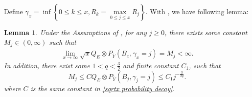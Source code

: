 \documentclass[]{article}
\numberwithin{equation}{section}
\theoremstyle{thmstyleone}%
\theoremstyle{thmstyletwo}%
\theoremstyle{thmstylethree}%
\theoremstyle{thmstylefour}%
\newtheorem{lemma}{Lemma}
\theoremstyle{thmstylefive}%
\theoremstyle{thmstylesix}%
\begin{document}
	Define $ \gamma_x = \inf\left\{0\leqslant k\leqslant x, R_k=\max\limits_{0\leqslant j\leqslant x} R_j\right\}$. 
	With , we have following lemma:
	
	\begin{lemma}\label{intermediately lemma}
		Under the Assumptions of , for any $j\geqslant 0$, there exists some constant $ M_j\in (0,\infty)$ such that
		\begin{align}
			\lim\limits_{x\rightarrow\infty}\sqrt{x}Q_E\otimes P_{\overline{Y}}
			\left( B_x,\gamma_x = j
			\right) = M_j<\infty.
		\end{align}
		In addition, there exist some $1<q<\frac{3}{2}$ and finite constant $C_1$, such that \[M_j\leqslant C Q_E\otimes P_{\overline{Y}} \left(
		B_j,\gamma_j=j\right) \leqslant C_1 j^{-\frac{3}{2q}}. \]
		where $C$ is the same constant in \cref{sqrtx probability decay}.
	\end{lemma}
	
\end{document}
